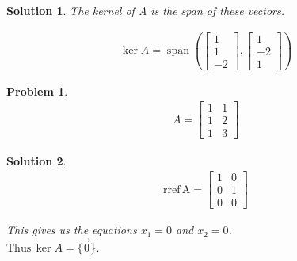 \documentclass{article}
\newtheorem{problem}{Problem}
\newtheorem*{solution}{Solution}
\newcommand{\rref}[1]{\mathrm{rref \, #1}}
\DeclareMathOperator{\Span}{span}
\begin{document}
\begin{solution}
The kernel of A is the span of these vectors.

\begin{align*}
\ker A = \Span \left( \begin{bmatrix} 1 \\ 1 \\ -2 \end{bmatrix}, \begin{bmatrix} 1 \\ -2 \\ 1 \end{bmatrix}  \right)
\end{align*}

\end{solution}

\begin{problem}
\begin{align*}
A = \begin{bmatrix}1 & 1 \\ 1 & 2 \\ 1 & 3 \end{bmatrix}
\end{align*}
\end{problem}

\begin{solution}
\begin{align*}
\rref{A} = \begin{bmatrix}1 & 0 \\ 0 & 1 \\ 0 & 0 \end{bmatrix}
\end{align*}

This gives us the equations $x_{1} = 0$ and $x_{2} = 0$. \\

$\mathrm{Thus} \, \ker A = \{ \vec{0} \}$.

\end{solution}
\end{document}
